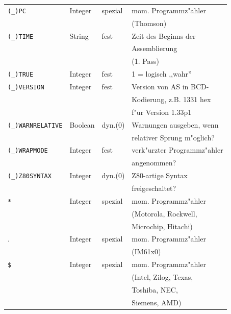 \documentclass[12pt,a4paper,twoside]{report}
\newcommand{\tty}[1]{{\tt #1}}
\newcommand{\asname}{AS}
\newcommand{\predefsym}[1]{{\tt (\_)#1}}
\begin{document}
\begin{center}
\begin{longtable}{|l|l|l|l|}
\predefsym{PC}         &  Integer    & spezial    & mom. Programmz"ahler \\
                       &             &            & (Thomson) \\
\hline
\predefsym{TIME}       &  String     & fest       & Zeit des Beginns der \\
                       &             &            & Assemblierung \\
                       &             &            & (1. Pass) \\
\hline
\predefsym{TRUE}       &  Integer    & fest       & 1 = logisch ,,wahr'' \\
\hline
\predefsym{VERSION}    &  Integer    & fest       & Version von \asname{} in BCD- \\
                       &             &            & Kodierung, z.B. 1331 hex \\
                       &             &            & f"ur Version 1.33p1 \\
\hline
\predefsym{WARNRELATIVE} & Boolean   & dyn.(0)    & Warnungen ausgeben, wenn \\
                       &             &            & relativer Sprung m"oglich? \\
\hline
\predefsym{WRAPMODE}   &  Integer    & fest       & verk"urzter Programmz"ahler \\
                       &             &            & angenommen? \\
\hline
\predefsym{Z80SYNTAX}  &  Integer    & dyn.(0)    & Z80-artige Syntax \\
                       &             &            & freigeschaltet? \\
\hline
\verb!*!               &  Integer    & spezial    & mom. Programmz"ahler \\
                       &             &            & (Motorola, Rockwell, \\
                       &             &            & Microchip, Hitachi) \\
\hline
.                      &  Integer    & spezial    & mom. Programmz"ahler \\
                       &             &            & (IM61x0) \\
\hline
\tty{\$}               &  Integer    & spezial    & mom. Programmz"ahler \\
                       &             &            & (Intel, Zilog, Texas, \\
                       &             &            & Toshiba, NEC, \\
                       &             &            & Siemens, AMD) \\
\hline
\end{longtable}\end{center}
\end{document}
